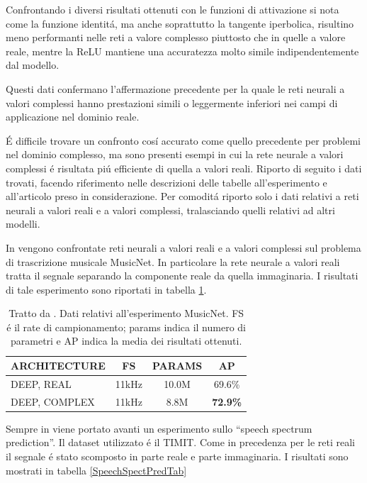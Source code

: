 \documentclass[a4paper,12pt]{report}
\begin{document}
 Confrontando i diversi risultati ottenuti con le funzioni di attivazione si nota come la funzione identit\'a, ma anche soprattutto la tangente iperbolica, risultino meno performanti nelle reti a valore complesso piuttosto che in quelle a valore reale, mentre la ReLU mantiene una accuratezza molto simile indipendentemente dal modello. 
 
 Questi dati confermano l'affermazione precedente per la quale le reti neurali a valori complessi hanno prestazioni simili o leggermente inferiori nei campi di applicazione nel dominio reale. 
 
 \'E difficile trovare un confronto cos\'i accurato come quello precedente per problemi nel dominio complesso, ma sono presenti esempi in cui la rete neurale a valori complessi \'e risultata pi\'u efficiente di quella a valori reali. 
 Riporto di seguito i dati trovati, facendo riferimento nelle descrizioni delle tabelle all'esperimento e all'articolo preso in considerazione. 
 Per comodit\'a riporto solo i dati relativi a reti neurali a valori reali e a valori complessi, tralasciando quelli relativi ad altri modelli.
 
 In \cite{trabelsi2017deep} vengono confrontate reti neurali a valori reali e a valori complessi sul problema di trascrizione musicale MusicNet. 
 In particolare la rete neurale a valori reali tratta il segnale separando la componente reale da quella immaginaria. I risultati di tale esperimento sono riportati in tabella \ref{MusicNetTab}.
 
 \begin{table}[h]
  \centering
  \begin{tabular}{l c c|c}
   \hline
   \textbf{ARCHITECTURE} & \textbf{FS} & \textbf{PARAMS} & \textbf{AP} \\
   \hline
   DEEP, REAL & 11kHz & 10.0M & 69.6\% \\
   DEEP, COMPLEX & 11kHz & 8.8M & \textbf{72.9\%} \\
   \hline
  \end{tabular}
  \caption{Tratto da \cite{trabelsi2017deep}. Dati relativi all'esperimento MusicNet. FS \'e il rate di campionamento; params indica il numero di parametri e AP indica la media dei risultati ottenuti.}
  \label{MusicNetTab}
 \end{table}
 
 Sempre in \cite{trabelsi2017deep} viene portato avanti un esperimento sullo ``speech spectrum prediction''. Il dataset utilizzato \'e il TIMIT. Come in precedenza per le reti reali il segnale \'e stato scomposto in parte reale e parte immaginaria. I risultati sono mostrati in tabella \ref{SpeechSpectPredTab}
 
\end{document}
